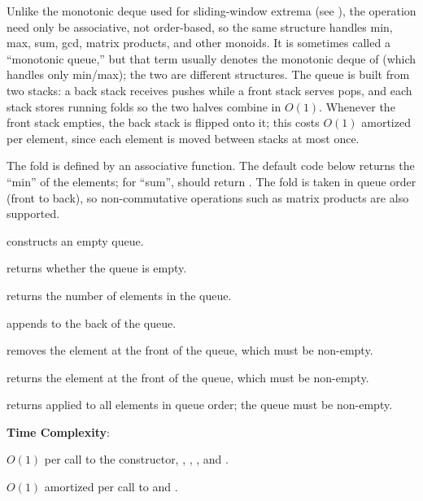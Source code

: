 Unlike the monotonic deque used for sliding-window extrema (see ), the operation need only be associative, not order-based, so the same structure handles min, max, sum, gcd, matrix products, and other monoids. It is sometimes called a ``monotonic queue,'' but that term usually denotes the monotonic deque of  (which handles only min/max); the two are different structures. The queue is built from two stacks: a back stack receives pushes while a front stack serves pops, and each stack stores running folds so the two halves combine in $O(1)$. Whenever the front stack empties, the back stack is flipped onto it; this costs $O(1)$ amortized per element, since each element is moved between stacks at most once.

The fold is defined by an associative  function. The default code below returns the ``min'' of the elements; for ``sum'',  should return . The fold is taken in queue order (front to back), so non-commutative operations such as matrix products are also supported.

\begin{compactitem}
  \item {} constructs an empty queue.
  \item {} returns whether the queue is empty.
  \item {} returns the number of elements in the queue.
  \item {} appends  to the back of the queue.
  \item {} removes the element at the front of the queue, which must be non-empty.
  \item {} returns the element at the front of the queue, which must be non-empty.
  \item {} returns  applied to all elements in queue order; the queue must be non-empty.
\end{compactitem}

\textbf{Time Complexity}:
\begin{compactitem}
  \item $O(1)$ per call to the constructor, , , , and .
  \item $O(1)$ amortized per call to  and .
\end{compactitem}

